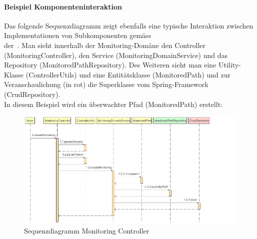 \documentclass[a4paper,12pt]{report}
\begin{document}
    \paragraph*{Beispiel Komponenteninteraktion}
    Das folgende Sequenzdiagramm zeigt ebenfalls eine typische Interaktion zwischen Implementationen von Subkomponenten gemäss \\
    der~.
    Man sieht innerhalb der Monitoring-Domäne den Controller (MonitoringController), den Service (MonitoringDomainService) und das Repository (MonitoredPathRepository).
    Des Weiteren sieht man eine Utility-Klasse (ControllerUtils) und eine Entitätsklasse (MonitoredPath) und zur Veranschaulichung (in rot) die Superklasse vom Spring-Framework (CrudRepository).
    \\In diesem Beispiel wird ein überwachter Pfad (MonitoredPath) erstellt:
    \begin{figure}
        \centering
        \includegraphics[width=1\textwidth]{assets/MonitoringController_createMonitoring_seq_diag}
        \caption{Sequenzdiagramm Monitoring Controller}
        \label{fig:seq-diag-monitoring-controller}
    \end{figure}

    \clearpage
\end{document}
